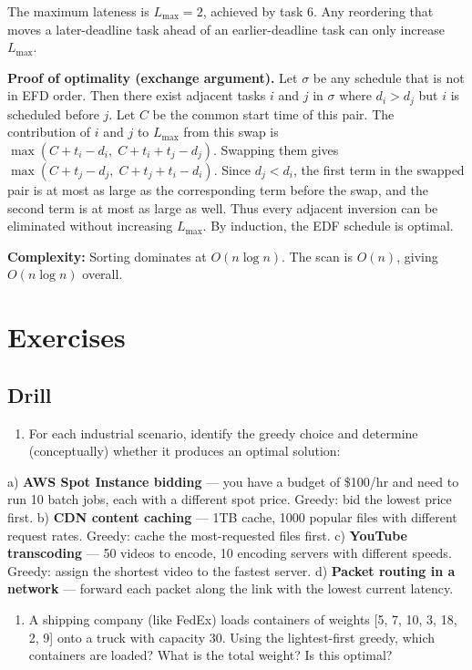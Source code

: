 The maximum lateness is $L_{\max} = 2$, achieved by task 6. Any reordering that moves a later-deadline task ahead of an earlier-deadline task can only increase $L_{\max}$.

\textbf{Proof of optimality (exchange argument).} Let $\sigma$ be any schedule that is not in EFD order. Then there exist adjacent tasks $i$ and $j$ in $\sigma$ where $d_i > d_j$ but $i$ is scheduled before $j$. Let $C$ be the common start time of this pair. The contribution of $i$ and $j$ to $L_{\max}$ from this swap is $\max(C + t_i - d_i,\; C + t_i + t_j - d_j)$. Swapping them gives $\max(C + t_j - d_j,\; C + t_j + t_i - d_i)$. Since $d_j < d_i$, the first term in the swapped pair is at most as large as the corresponding term before the swap, and the second term is at most as large as well. Thus every adjacent inversion can be eliminated without increasing $L_{\max}$. By induction, the EDF schedule is optimal.

\textbf{Complexity:} Sorting dominates at $O(n \log n)$. The scan is $O(n)$, giving $O(n \log n)$ overall.

\section{Exercises}

\subsection{Drill}

\begin{enumerate}
\item For each industrial scenario, identify the greedy choice and determine (conceptually) whether it produces an optimal solution:
\end{enumerate}
   a) \textbf{AWS Spot Instance bidding} — you have a budget of \$100/hr and need to run 10 batch jobs, each with a different spot price. Greedy: bid the lowest price first.
   b) \textbf{CDN content caching} — 1TB cache, 1000 popular files with different request rates. Greedy: cache the most-requested files first.
   c) \textbf{YouTube transcoding} — 50 videos to encode, 10 encoding servers with different speeds. Greedy: assign the shortest video to the fastest server.
   d) \textbf{Packet routing in a network} — forward each packet along the link with the lowest current latency.

\begin{enumerate}
\item A shipping company (like FedEx) loads containers of weights [5, 7, 10, 3, 18, 2, 9] onto a truck with capacity 30. Using the lightest-first greedy, which containers are loaded? What is the total weight? Is this optimal?
\end{enumerate}

